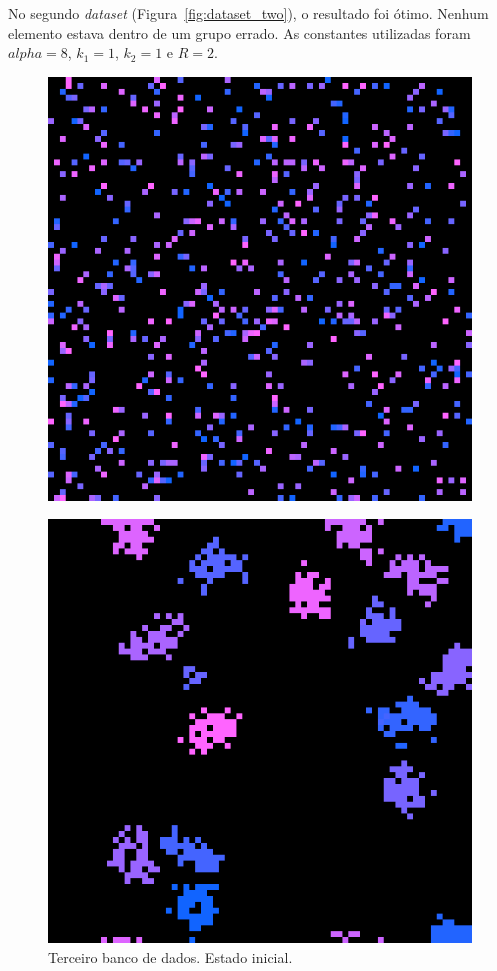 \documentclass[conference]{IEEEtran}
\begin{document}
No segundo \textit{dataset} (Figura~\ref{fig:dataset_two}), o resultado foi ótimo. Nenhum elemento estava dentro de um grupo errado.
As constantes utilizadas foram $alpha=8$, $k_1 = 1$, $k_2 = 1$ e $R=2$.


\begin{figure}[H] 
  \begin{minipage}[b]{0.5\linewidth}
    \label{fig:dataset_three}
    \centering
    \includegraphics[width=.8\linewidth]{resultados/data/dataset_three/2-0.png} 
    \caption{Terceiro banco de dados. Estado inicial.} 
    \vspace{4ex}
  \end{minipage}%
  \begin{minipage}[b]{0.5\linewidth}
    \centering
    \includegraphics[width=.8\linewidth]{resultados/data/dataset_three/2-1.png} 

\end{minipage}
\end{figure}
\end{document}
